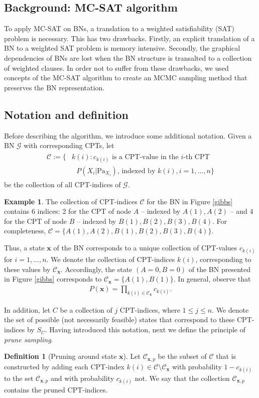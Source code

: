 \documentclass[a4paper, twoside, 11pt]{report}
\theoremstyle{plain}
\theoremstyle{definition}
\newtheorem{definition}[thm]{Definition}
\newtheorem{example}[thm]{Example}
\theoremstyle{remark}
\newcommand{\C}{{\mathcal C}}
\newcommand{\G}{{\mathcal G}}
\newcommand{\bfx}{{\mathbf{x}}}
\begin{document}
\subsection{Background: MC-SAT algorithm}
To apply MC-SAT on BNs, a translation to a weighted satisfiability (SAT) problem is necessary. This has two drawbacks. Firstly, an explicit translation of a BN to a weighted SAT problem is memory intensive. Secondly, the graphical dependencies of BNs are lost when the BN structure is transalted to a collection of weighted clauses. In order not to suffer from these drawbacks, we used concepts of the MC-SAT algorithm to create an MCMC sampling method that preserves the BN representation. 

\subsection{Notation and definition}
\indent Before describing the algorithm, we introduce some additional notation. Given a BN $\G$ with corresponding CPTs, let
\begin{align}
\begin{split}
\C := \{ & k(i) : c_{ k(i)} \text{ is a CPT-value in the $i$-th CPT} \\
& \text{ $P(X_i | \text{Pa}_{X_i})$, indexed by $k(i), i = 1, \ldots , n$} \}
\end{split}
\end{align}
be the collection of all CPT-indices of $\G$. 

\begin{example} The collection of CPT-indices $\C$ for the BN in Figure \ref{gibbs} contains 6 indices: 2 for the CPT of node $A$ -- indexed by $A(1), A(2)$ -- and 4 for the CPT of node $B$ -- indexed by $B(1), B(2), B(3), B(4)$. For completeness, $\C = \{ A(1), A(2), B(1), B(2), B(3), B(4) \}$.
\end{example}

Thus, a state $\bfx$ of the BN corresponds to a unique collection of CPT-values $c_{ k(i)}$ for $i = 1, . . . , n$. We denote the collection of CPT-indices $k(i)$, corresponding to these values by $\C_\bfx$. Accordingly, the state $(A = 0, B = 0)$ of the BN presented in Figure \ref{gibbs} corresponds to $\C_\bfx = \{ A(1), B(1) \}$. In general, observe that 
\begin{align*}
P(\bfx) = \prod_{k(i) \in \C_\bfx} c_{ k(i)}.
\end{align*}

In addition, let $C$ be a collection of $j$ CPT-indices, where $1 \leq j \leq n$. We denote the set of possible (not necessarily feasible) states that correspond to these CPT-indices by $S_C$. Having introduced this notation, next we define the principle of \textit{prune sampling}.
\begin{definition}[Pruning around state $\bfx$]\label{prunedef}
Let $\C_{\bfx,p}$ be the subset of $\C$ that is constructed by adding each CPT-index $k(i) \in \C \setminus \C_{\bfx}$ with probability $1-c_{k(i)}$ to the set $\C_{\bfx,p}$ and with probability $c_{k(i)}$ not. We say that the collection $\C_{\bfx,p}$ contains the pruned CPT-indices. 
\end{definition}
\end{document}

